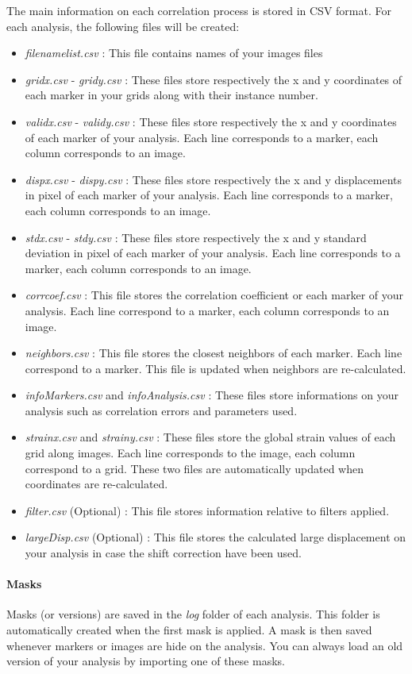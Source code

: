 \indent\indent The main information on each correlation process is stored in CSV format. For each analysis, the following files will be created:
\begin{itemize}
  \item \textit{filenamelist.csv} : This file contains names of your images files
  \item \textit{gridx.csv} - \textit{gridy.csv} : These files store respectively the x and y coordinates of each marker in your grids along with their instance number.
  \item \textit{validx.csv} - \textit{validy.csv} : These files store respectively the x and y coordinates of each marker of your analysis. Each line corresponds to a marker, each column corresponds to an image.
  \item \textit{dispx.csv} - \textit{dispy.csv} : These files store respectively the x and y displacements in pixel of each marker of your analysis. Each line corresponds to a marker, each column corresponds to an image.
  \item \textit{stdx.csv} - \textit{stdy.csv} : These files store respectively the x and y standard deviation in pixel of each marker of your analysis. Each line corresponds to a marker, each column corresponds to an image.
  \item \textit{corrcoef.csv} : This file stores the correlation coefficient or each marker of your analysis. Each line correspond to a marker, each column corresponds to an image.
  \item \textit{neighbors.csv} : This file stores the closest neighbors of each marker. Each line correspond to a marker. This file is updated when neighbors are re-calculated.
  \item \textit{infoMarkers.csv} and \textit{infoAnalysis.csv} : These files store informations on your analysis such as correlation errors and parameters used.
  \item \textit{strainx.csv} and \textit{strainy.csv} : These files store the global strain values of each grid along images. Each line corresponds to the image, each column correspond to a grid. These two files are automatically updated when coordinates are re-calculated.
  \item \textit{filter.csv} (Optional) : This file stores information relative to filters applied.
  \item \textit{largeDisp.csv} (Optional) : This file stores the calculated large displacement on your analysis in case the shift correction have been used.
\end{itemize}

\paragraph{Masks\\\newline}
\label{par:Masks}
\newline
\indent Masks (or versions) are saved in the \textit{log} folder of each analysis. This folder is automatically created when the first mask is applied. A mask is then saved whenever markers or images are hide on the analysis. You can always load an old version of your analysis by importing one of these masks.

